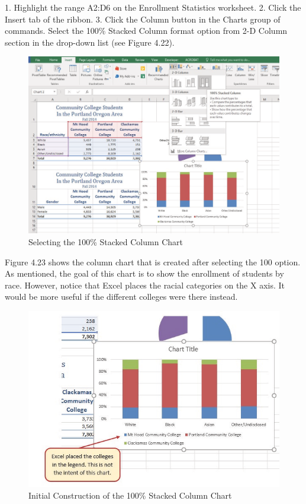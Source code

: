 1. Highlight the range A2:D6 on the Enrollment Statistics worksheet.
2. Click the Insert tab of the ribbon.
3. Click the Column button in the Charts group of commands. Select the 100\% Stacked Column
format option from 2-D Column section in the drop-down list (see Figure 4.22).



\begin{figure}[H]
	\centering
	\includegraphics[width=\maxwidth{.95\linewidth}]{gfx/ch04_fig23}
	\caption{Selecting the 100\% Stacked Column Chart}
	\label{04:fig23}
\end{figure}


Figure 4.23 shows the column chart that is created after selecting the 100%
option. As mentioned, the goal of this chart is to show the enrollment of students by race. However,
notice that Excel places the racial categories on the X axis. It would be more useful if the different
colleges were there instead.



\begin{figure}[H]
	\centering
	\includegraphics[width=\maxwidth{.95\linewidth}]{gfx/ch04_fig24}
	\caption{Initial Construction of the 100\% Stacked Column Chart}
	\label{04:fig24}
\end{figure}





